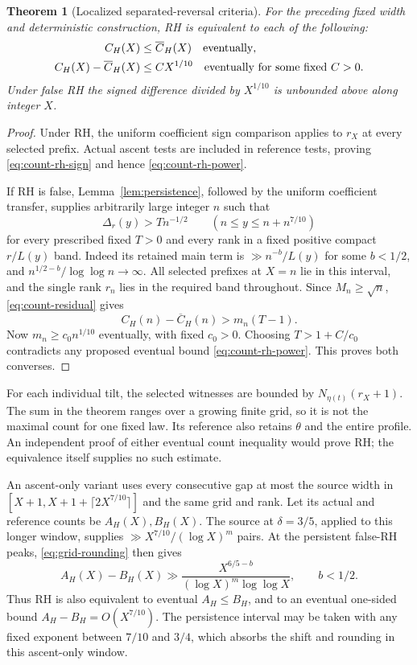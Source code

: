 \documentclass[11pt]{article}
\newtheorem{theorem}{Theorem}[section]
\theoremstyle{definition}
\begin{document}
\begin{theorem}[Localized separated-reversal criteria]\label{thm:count-rh}
For the preceding fixed width and deterministic construction, RH is
equivalent to each of the following:
\begin{align}
 C_H(X)&\le\overline C_H(X)\quad\hbox{eventually},\label{eq:count-rh-sign}\\
 C_H(X)-\overline C_H(X)&\le C X^{1/10}
 \quad\hbox{eventually for some fixed }C>0.\label{eq:count-rh-power}
\end{align}
Under false RH the signed difference divided by $X^{1/10}$ is
unbounded above along integer $X$.
\end{theorem}
\begin{proof}
Under RH, the uniform coefficient sign comparison applies to
$r_X$ at every selected prefix. Actual ascent tests are included
in reference tests, proving \eqref{eq:count-rh-sign} and hence
\eqref{eq:count-rh-power}.

If RH is false, Lemma~\ref{lem:persistence}, followed by the
uniform coefficient transfer, supplies arbitrarily large integer
$n$ such that
\[
 \Delta_r(y)>T n^{-1/2}\qquad
 (n\le y\le n+n^{7/10})
\]
for every prescribed fixed $T>0$ and every rank in a fixed positive
compact $r/L(y)$ band. Indeed its retained main term is
$\gg n^{-b}/L(y)$ for some $b<1/2$, and
$n^{1/2-b}/\log\log n\to\infty$.
All selected prefixes at $X=n$ lie in this interval, and the single
rank $r_n$ lies in the required band throughout.
Since $M_n\ge\sqrt n$, \eqref{eq:count-residual} gives
\[
 C_H(n)-\overline C_H(n)>m_n(T-1).
\]
Now $m_n\ge c_0n^{1/10}$ eventually, with fixed $c_0>0$.
Choosing $T>1+C/c_0$ contradicts any proposed eventual bound
\eqref{eq:count-rh-power}. This proves both converses.
\end{proof}

For each individual tilt, the selected witnesses are bounded by
$N_{\eta(t)}(r_X+1)$. The sum in the theorem ranges over a growing
finite grid, so it is not the maximal count for one fixed law.
Its reference also retains $\theta$ and the entire profile.
An independent proof of either eventual count inequality would
prove RH; the equivalence itself supplies no such estimate.

An ascent-only variant uses every consecutive gap at most the source
width in $[X+1,X+1+\lceil2X^{7/10}\rceil]$ and the same grid and rank.
Let its actual and reference counts be $A_H(X),B_H(X)$.
The source at $\delta=3/5$, applied to this longer window, supplies
$\gg X^{7/10}/(\log X)^m$ pairs. At the persistent false-RH peaks,
\eqref{eq:grid-rounding} then gives
\[
 A_H(X)-B_H(X)\gg
 \frac{X^{6/5-b}}{(\log X)^m\log\log X},\qquad b<1/2.
\]
Thus RH is also equivalent to eventual $A_H\le B_H$, and to
an eventual one-sided bound $A_H-B_H=O(X^{7/10})$.
The persistence interval may be taken with any fixed exponent
between $7/10$ and $3/4$, which absorbs the shift and rounding
in this ascent-only window.
\end{document}
